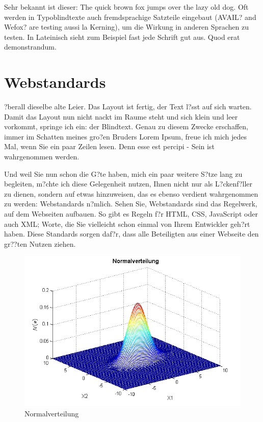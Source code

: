 Sehr bekannt ist dieser: The quick brown fox jumps over the lazy old dog. Oft werden in Typoblindtexte auch fremdsprachige Satzteile eingebaut (AVAIL? and Wefox? are testing aussi la Kerning), um die Wirkung in anderen Sprachen zu testen. In Lateinisch sieht zum Beispiel fast jede Schrift gut aus. Quod erat demonstrandum.

\section{Webstandards}
\label{sec:satzspiegeltest_webstandards}

?berall dieselbe alte Leier. Das Layout ist fertig, der Text l?sst auf sich warten. Damit das Layout nun nicht nackt im Raume steht und sich klein und leer vorkommt, springe ich ein: der Blindtext. Genau zu diesem Zwecke erschaffen, immer im Schatten meines gro?en Bruders \glqq Lorem Ipsum\grqq, freue ich mich jedes Mal, wenn Sie ein paar Zeilen lesen. Denn esse est percipi - Sein ist wahrgenommen werden.

Und weil Sie nun schon die G?te haben, mich ein paar weitere S?tze lang zu begleiten, m?chte ich diese Gelegenheit nutzen, Ihnen nicht nur als L?ckenf?ller zu dienen, sondern auf etwas hinzuweisen, das es ebenso verdient wahrgenommen zu werden: Webstandards n?mlich. Sehen Sie, Webstandards sind das Regelwerk, auf dem Webseiten aufbauen. So gibt es Regeln f?r HTML, CSS, JavaScript oder auch XML; Worte, die Sie vielleicht schon einmal von Ihrem Entwickler geh?rt haben. Diese Standards sorgen daf?r, dass alle Beteiligten aus einer Webseite den gr??ten Nutzen ziehen.

\begin{figure}[H]
	\centering
		\includegraphics[scale=0.7]{bilder/multivariate_gauss.png}
	\caption{Normalverteilung}
	\label{fig:normalverteilung}
\end{figure}

